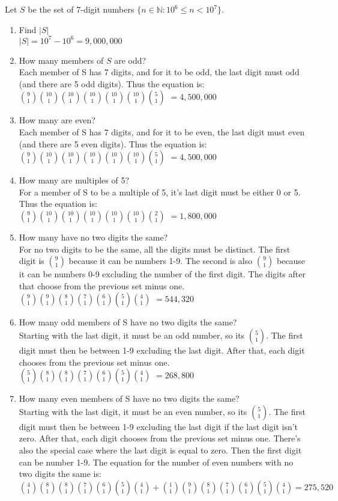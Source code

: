 \documentclass[12pt]{article}
\newcommand{\N}{\mathbb{N}}
\newcommand{\be}{\begin{enumerate}}
\newcommand{\ee}{\end{enumerate}}
\newcommand{\seti}[1]{\setcounter{enumi}{#1}}
\begin{document}
\seti{12}
\item Let $S$ be the set of 7-digit numbers $\{n\in\N:10^6\leq n<10^7\}$.
	\be
	\item Find $|S|$\\
	$|S|=10^7-10^6=9,000,000$
	\item How many members of $S$ are odd?\\
	Each member of S has 7 digits, and for it to be odd, the last digit must odd 
	(and there are 5 odd digits). Thus the equation is:\\
	${9\choose1}{10\choose1}{10\choose1}{10\choose1}{10\choose1}{10\choose1}{5\choose1}$
	$=4,500,000$
	\item How many are even?\\
	Each member of S has 7 digits, and for it to be even, the last digit must even 
	(and there are 5 even digits). Thus the equation is:\\
	${9\choose1}{10\choose1}{10\choose1}{10\choose1}{10\choose1}{10\choose1}{5\choose1}$
	$=4,500,000$
	\item How many are multiples of 5?\\
	For a member of S to be a multiple of 5, it's last digit must be either 0 or 5. Thus the equation is:\\
	${9\choose1}{10\choose1}{10\choose1}{10\choose1}{10\choose1}{10\choose1}{2\choose1}$
	$=1,800,000$	
	\item How many have no two digits the same?\\
	For no two digits to be the same, all the digits must be distinct. The first digit is ${9\choose1}$ 
	because it can be numbers 1-9. The second is also ${9\choose1}$ because it can be numbers
	0-9 excluding the number of the first digit. The digits after that choose from the previous set minus one.
	\\
	${9\choose1}{9\choose1}{8\choose1}{7\choose1}{6\choose1}{5\choose1}{4\choose1}$
	$=544,320$
	\item How many odd members of S have no two digits the same?\\
	Starting with the last digit, it must be an odd number, so its $5\choose1$. The first digit must then be 
	between 1-9 excluding the last digit. After that, each digit chooses from the previous set minus one.\\
	${5\choose1}{8\choose1}{8\choose1}{7\choose1}{6\choose1}{5\choose1}{4\choose1}$
	$=268,800$
	\item How many even members of S have no two digits the same?\\
	Starting with the last digit, it must be an even number, so its $5\choose1$. The first digit must then be 
	between 1-9 excluding the last digit if the last digit isn't zero. After that, each digit chooses from the 
	previous set minus one. There's also the special case where the last digit is equal to zero. Then the 
	first digit can be number 1-9. The equation for the number of even numbers with no two digits the 
	same is:\\
	${4\choose1}{8\choose1}{8\choose1}{7\choose1}{6\choose1}{5\choose1}{4\choose1}+
	{1\choose1}{9\choose1}{8\choose1}{7\choose1}{6\choose1}{5\choose1}{4\choose1}
	=275,520$
	\ee
	
\end{document}
